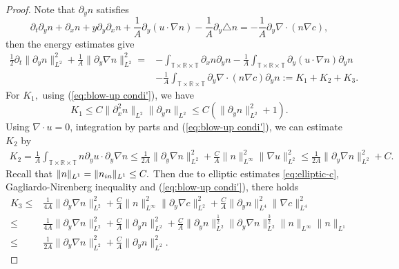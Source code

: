 \documentclass[12pt, reqno]{amsart}
\numberwithin{equation}{section}
\begin{document}
\begin{proof}
Note that $ \partial_{y}n $ satisfies
	\begin{equation*}
		\partial_{t}\partial_{y}n+\partial_{x}n+y\partial_{y}\partial_{x}n+\frac{1}{A}\partial_{y}(u\cdot\nabla n)-\frac{1}{A}\partial_{y}\triangle n=-\frac{1}{A}\partial_{y}\nabla\cdot(n\nabla c),
	\end{equation*}
 then the energy estimates give
	\begin{equation}\label{n'}
		\begin{aligned}
		\frac12\partial_{t}\|\partial_{y}n\|_{L^{2}}^{2}+\frac{1}{A}\|\partial_{y}\nabla n\|_{L^{2}}^{2}=&-\int_{\mathbb{T}\times\mathbb{R}\times\mathbb{T}}\partial_{x}n\partial_{y}n-\frac{1}{A}\int_{\mathbb{T}\times\mathbb{R}\times\mathbb{T}}\partial_{y}(u\cdot\nabla n)\partial_{y}n\\&-\frac{1}{A}\int_{\mathbb{T}\times\mathbb{R}\times\mathbb{T}}\partial_{y}\nabla\cdot(n\nabla c)\partial_{y}n:=K_{1}+K_{2}+K_{3}.
		\end{aligned}
	\end{equation}
	For $ K_{1}, $ using (\ref{eq:blow-up condi'}), we have
	\begin{equation*}
		K_{1}\leq C\|\partial_{x}^{2}n\|_{L^{2}}\|\partial_{y}n\|_{L^{2}}\leq C\left(\|\partial_{y}n\|_{L^{2}}^{2}+1 \right).
	\end{equation*}
	Using $ \nabla\cdot u=0 $, integration by parts and (\ref{eq:blow-up condi'}), we can estimate $ K_{2} $ by
	\begin{equation*}
		\begin{aligned}
		K_{2}=\frac{1}{A}\int_{\mathbb{T}\times\mathbb{R}\times\mathbb{T}}n\partial_{y}u\cdot\partial_{y}\nabla n\leq \frac{1}{2A}\|\partial_{y}\nabla n\|_{L^{2}}^{2}+\frac{C}{A}\|n\|_{L^{\infty}}^{2}\|\nabla u\|_{L^{2}}^{2}\leq\frac{1}{2A}\|\partial_{y}\nabla n\|_{L^{2}}^{2}+C.
		\end{aligned}
	\end{equation*}
	Recall that $ \|n\|_{L^{1}}=\|n_{\rm in}\|_{L^{1}}\leq C. $ Then
	due to elliptic estimates \eqref{eq:elliptic-c}, Gagliardo-Nirenberg inequality and (\ref{eq:blow-up condi'}), there holds
	\begin{equation*}
		\begin{aligned}
		K_{3}\leq&\frac{1}{4A}\|\partial_{y}\nabla n\|_{L^{2}}^{2}+\frac{C}{A}\|n\|_{L^{\infty}}^{2}\|\partial_{y}\nabla c\|_{L^{2}}^{2}+\frac{C}{A}\|\partial_{y}n\|_{L^{4}}^{2}\|\nabla c\|_{L^{4}}^{2}\\\leq&\frac{1}{4A}\|\partial_{y}\nabla n\|_{L^{2}}^{2}+\frac{C}{A}\|\partial_{y}n\|_{L^{2}}^{2}+\frac{C}{A}\|\partial_{y}n\|_{L^{2}}^{\frac12}\|\partial_{y}\nabla n\|_{L^{2}}^{\frac32}\|n\|_{L^{\infty}}\|n\|_{L^{1}}\\\leq&\frac{1}{2A}\|\partial_{y}\nabla n\|_{L^{2}}^{2}+\frac{C}{A}\|\partial_{y}n\|_{L^{2}}^{2}.

\end{aligned}
\end{equation*}
\end{proof}
\end{document}
